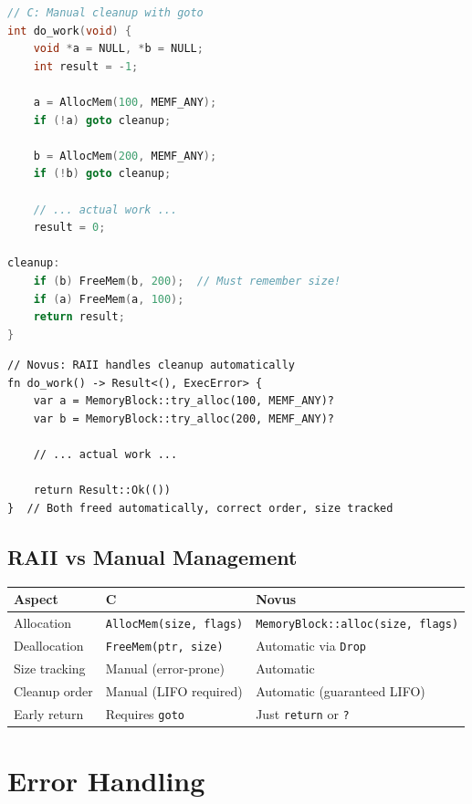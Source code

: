 \begin{lstlisting}[language=C]
// C: Manual cleanup with goto
int do_work(void) {
    void *a = NULL, *b = NULL;
    int result = -1;

    a = AllocMem(100, MEMF_ANY);
    if (!a) goto cleanup;

    b = AllocMem(200, MEMF_ANY);
    if (!b) goto cleanup;

    // ... actual work ...
    result = 0;

cleanup:
    if (b) FreeMem(b, 200);  // Must remember size!
    if (a) FreeMem(a, 100);
    return result;
}
\end{lstlisting}

\begin{lstlisting}
// Novus: RAII handles cleanup automatically
fn do_work() -> Result<(), ExecError> {
    var a = MemoryBlock::try_alloc(100, MEMF_ANY)?
    var b = MemoryBlock::try_alloc(200, MEMF_ANY)?

    // ... actual work ...

    return Result::Ok(())
}  // Both freed automatically, correct order, size tracked
\end{lstlisting}

\subsection{RAII vs Manual Management}

\begin{center}
\begin{tabular}{lp{5cm}p{5cm}}
\textbf{Aspect} & \textbf{C} & \textbf{Novus} \\
\hline
Allocation & \texttt{AllocMem(size, flags)} & \texttt{MemoryBlock::alloc(size, flags)} \\
Deallocation & \texttt{FreeMem(ptr, size)} & Automatic via \texttt{Drop} \\
Size tracking & Manual (error-prone) & Automatic \\
Cleanup order & Manual (LIFO required) & Automatic (guaranteed LIFO) \\
Early return & Requires \texttt{goto} & Just \texttt{return} or \texttt{?} \\
\end{tabular}
\end{center}

\section{Error Handling}

